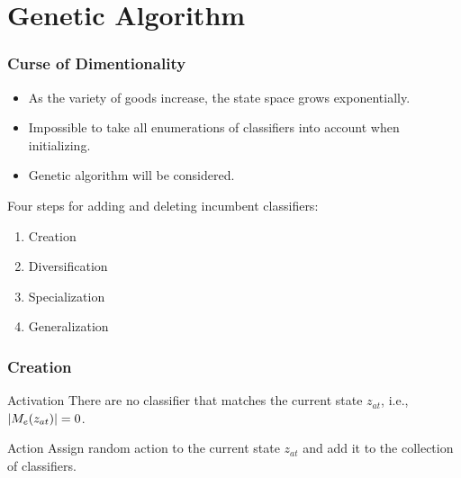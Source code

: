 \section{Genetic Algorithm}

\begin{frame}
    \frametitle{Curse of Dimentionality}
    \begin{itemize}
        \item As the variety of goods increase, the state space grows exponentially.
        \item Impossible to take all enumerations of classifiers into account when initializing. 
        \item Genetic algorithm will be considered.
    \end{itemize}
    
    \pause

    Four steps for adding and deleting incumbent classifiers:
    \begin{enumerate}
        \item Creation
        \item Diversification
        \item Specialization
        \item Generalization
    \end{enumerate}
\end{frame}

\begin{frame}
    \frametitle{Creation}

    \begin{block}{Activation}
        There are no classifier that matches the current state $z_{at}$, i.e., 
        $|M_e(z_{at})|=0$.
    \end{block}

    \begin{block}{Action}
        Assign random action to the current state $z_{at}$ and add it to the 
        collection of classifiers.
    \end{block}
\end{frame}


